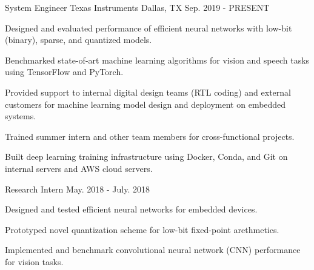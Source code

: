 

\begin{cventries}

\cventry
{System Engineer} %
{Texas Instruments} %
{Dallas, TX} %
{Sep. 2019 - PRESENT} %
{
		\begin{cvitems} %
			\item {Designed and evaluated performance of efficient neural networks with low-bit (binary), sparse, and quantized models.}
			\item {Benchmarked state-of-art machine learning algorithms for vision and speech tasks using TensorFlow and PyTorch.}
			\item {Provided support to internal digital design teams (RTL coding) and external customers for machine learning model design and deployment on embedded systems.}
			\item {Trained summer intern and other team members for cross-functional projects.}
			\item {Built deep learning training infrastructure using Docker, Conda, and Git on internal servers and AWS cloud servers.}
		\end{cvitems}
}

\cventry
{Research Intern} %
{} %
{} %
{May. 2018 - July. 2018} %
{
		\begin{cvitems} %
				\item {Designed and tested efficient neural networks for embedded devices.}
				\item {Prototyped novel quantization scheme for low-bit fixed-point arethmetics.}
				\item {Implemented and benchmark convolutional neural network (CNN) performance for vision tasks.}
		\end{cvitems}
}


\end{cventries}
